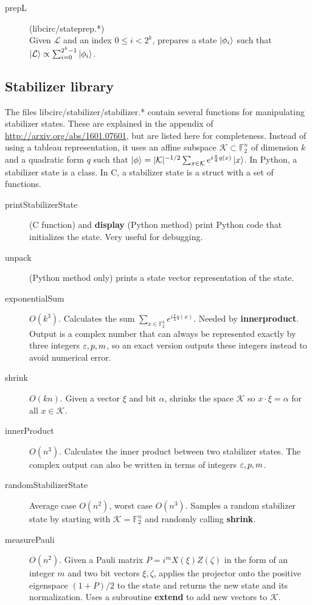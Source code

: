 \documentclass[11pt]{article}
\begin{document}
\begin{description}
    \item[prepL] (libcirc/stateprep.*) \\Given $\mathcal{L}$ and an index $0 \leq i < 2^{ k}$, prepares a state $\ket{\phi_i}$ such that $\ket{\mathcal{L}} \propto \sum_{i=0}^{2^{k}-1} \ket{\phi_i} $. 
  

\end{description}

\subsection{Stabilizer library}

The files libcirc/stabilizer/stabilizer.* contain several functions for manipulating stabilizer states. These are explained in the appendix of \url{http://arxiv.org/abs/1601.07601}, but are listed here for completeness. Instead of using a tableau representation, it uses an affine subspace $\mathcal{K} \subset \mathbb{F}^{n}_2$ of dimension $k$ and a quadratic form $q$ such that $\ket{\phi} = |\mathcal{K}|^{-1/2}\sum_{x \in \mathcal{K}}e^{i \frac{\pi}{4}q(x)} \ket{x}$. In Python, a stabilizer state is a class. In C, a stabilizer state is a struct with a set of functions.

\begin{description}
    \item[printStabilizerState] (C function) and \textbf{display} (Python method) print Python code that initializes the state. Very useful for debugging.
    \item[unpack] (Python method only) prints a state vector representation of the state.
    \item[exponentialSum] $O(k^3)$. Calculates the sum $\sum_{x \in \mathbb{F}^k_2} e^{i\frac{\pi}{4}q(x)}$. Needed by \textbf{innerproduct}. Output is a complex number that can always be represented exactly by three integers $\varepsilon, p, m$, so an exact version outputs these integers instead to avoid numerical error.
    \item[shrink] $O(kn)$. Given a vector $\xi$ and bit $\alpha$, shrinks the space $\mathcal{K}$ so $x \cdot \xi = \alpha$ for all $x \in \mathcal{K}$.
    \item[innerProduct] $O(n^3)$. Calculates the inner product between two stabilizer states. The complex output can also be written in terms of integers $\varepsilon,p,m$.
    \item[randomStabilizerState] Average case $O(n^2)$, worst case $O(n^3)$. Samples a random stabilizer state by starting with $\mathcal{K} = \mathbb{F}^n_2$ and randomly calling \textbf{shrink}.
    \item[measurePauli] $O(n^2)$. Given a Pauli matrix $P = i^m X(\xi)Z(\zeta)$ in the form of an integer $m$ and two bit vectors $\xi,\zeta$, applies the projector onto the positive eigenspace $(1+P)/2$ to the state and returns the new state and its normalization. Uses a subroutine \textbf{extend} to add new vectors to $\mathcal{K}$.

\end{description}
\end{document}
